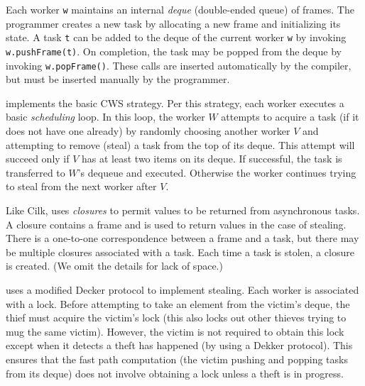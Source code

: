 Each worker {\tt w} maintains an internal {\em deque} (double-ended
queue) of frames. The programmer creates a new task by allocating a
new frame and initializing its state.  A task {\tt t} can be added to
the deque of the current worker {\tt w} by invoking {\tt
w.pushFrame(t)}. On completion, the task may be popped from the deque
by invoking {\tt w.popFrame()}. These calls are inserted automatically
by the \Xten{} compiler, but must be inserted manually by the \XWS{}
programmer.

\XWS{} implements the basic CWS strategy. Per this strategy, each
worker executes a basic {\em scheduling} loop. In this loop, the
worker $W$ attempts to acquire a task (if it does not have one
already) by randomly choosing another worker $V$ and attempting to
remove (steal) a task from the top of its deque. This attempt will
succeed only if $V$ has at least two items on its deque. If
successful, the task is transferred to $W$'s dequeue and
executed. Otherwise the worker continues trying to steal from the next
worker after $V$.  

Like Cilk, \XWS{} uses {\em closures} to permit values to be returned
from asynchronous tasks.  A closure contains a frame and is used to
return values in the case of stealing. There is a one-to-one
correspondence between a frame and a task, but there may be multiple
closures associated with a task. Each time a task is stolen, a closure
is created.  (We omit the details for lack of space.)

\XWS{} uses a modified Decker protocol \cite{frigo98implementation} to
implement stealing. Each worker is associated with a lock. Before
attempting to take an element from the victim's deque, the thief must
acquire the victim's lock (this also locks out other thieves trying to
mug the same victim). However, the victim is not required to obtain
this lock except when it detects a theft has happened (by using a
Dekker protocol). This ensures that the fast path computation (the
victim pushing and popping tasks from its deque) does not involve
obtaining a lock unless a theft is in progress.

